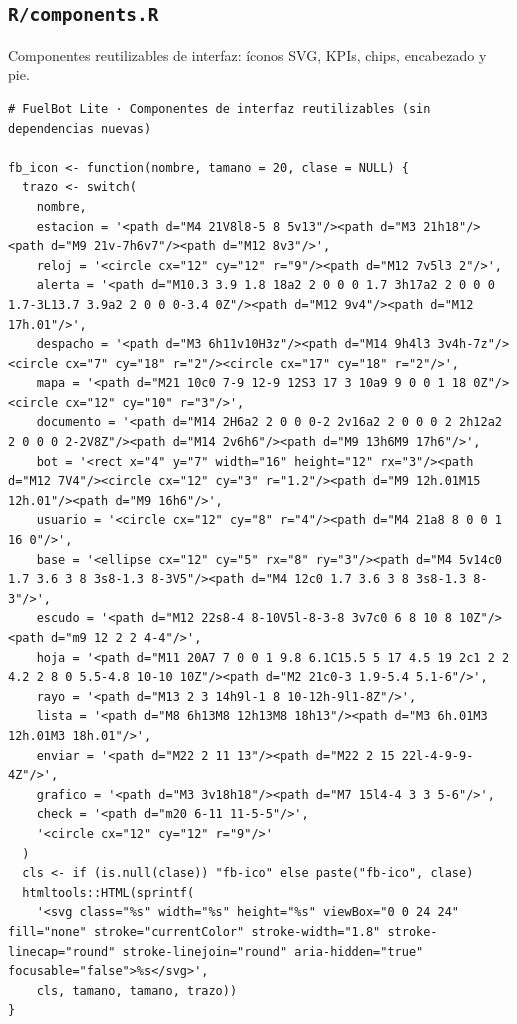 \subsection{\texttt{R/components.R}}
Componentes reutilizables de interfaz: íconos SVG, KPIs, chips, encabezado y pie.
\begin{lstlisting}[style=anexoR]
# FuelBot Lite · Componentes de interfaz reutilizables (sin dependencias nuevas)

fb_icon <- function(nombre, tamano = 20, clase = NULL) {
  trazo <- switch(
    nombre,
    estacion = '<path d="M4 21V8l8-5 8 5v13"/><path d="M3 21h18"/><path d="M9 21v-7h6v7"/><path d="M12 8v3"/>',
    reloj = '<circle cx="12" cy="12" r="9"/><path d="M12 7v5l3 2"/>',
    alerta = '<path d="M10.3 3.9 1.8 18a2 2 0 0 0 1.7 3h17a2 2 0 0 0 1.7-3L13.7 3.9a2 2 0 0 0-3.4 0Z"/><path d="M12 9v4"/><path d="M12 17h.01"/>',
    despacho = '<path d="M3 6h11v10H3z"/><path d="M14 9h4l3 3v4h-7z"/><circle cx="7" cy="18" r="2"/><circle cx="17" cy="18" r="2"/>',
    mapa = '<path d="M21 10c0 7-9 12-9 12S3 17 3 10a9 9 0 0 1 18 0Z"/><circle cx="12" cy="10" r="3"/>',
    documento = '<path d="M14 2H6a2 2 0 0 0-2 2v16a2 2 0 0 0 2 2h12a2 2 0 0 0 2-2V8Z"/><path d="M14 2v6h6"/><path d="M9 13h6M9 17h6"/>',
    bot = '<rect x="4" y="7" width="16" height="12" rx="3"/><path d="M12 7V4"/><circle cx="12" cy="3" r="1.2"/><path d="M9 12h.01M15 12h.01"/><path d="M9 16h6"/>',
    usuario = '<circle cx="12" cy="8" r="4"/><path d="M4 21a8 8 0 0 1 16 0"/>',
    base = '<ellipse cx="12" cy="5" rx="8" ry="3"/><path d="M4 5v14c0 1.7 3.6 3 8 3s8-1.3 8-3V5"/><path d="M4 12c0 1.7 3.6 3 8 3s8-1.3 8-3"/>',
    escudo = '<path d="M12 22s8-4 8-10V5l-8-3-8 3v7c0 6 8 10 8 10Z"/><path d="m9 12 2 2 4-4"/>',
    hoja = '<path d="M11 20A7 7 0 0 1 9.8 6.1C15.5 5 17 4.5 19 2c1 2 2 4.2 2 8 0 5.5-4.8 10-10 10Z"/><path d="M2 21c0-3 1.9-5.4 5.1-6"/>',
    rayo = '<path d="M13 2 3 14h9l-1 8 10-12h-9l1-8Z"/>',
    lista = '<path d="M8 6h13M8 12h13M8 18h13"/><path d="M3 6h.01M3 12h.01M3 18h.01"/>',
    enviar = '<path d="M22 2 11 13"/><path d="M22 2 15 22l-4-9-9-4Z"/>',
    grafico = '<path d="M3 3v18h18"/><path d="M7 15l4-4 3 3 5-6"/>',
    check = '<path d="m20 6-11 11-5-5"/>',
    '<circle cx="12" cy="12" r="9"/>'
  )
  cls <- if (is.null(clase)) "fb-ico" else paste("fb-ico", clase)
  htmltools::HTML(sprintf(
    '<svg class="%s" width="%s" height="%s" viewBox="0 0 24 24" fill="none" stroke="currentColor" stroke-width="1.8" stroke-linecap="round" stroke-linejoin="round" aria-hidden="true" focusable="false">%s</svg>',
    cls, tamano, tamano, trazo))
}


\end{lstlisting}
